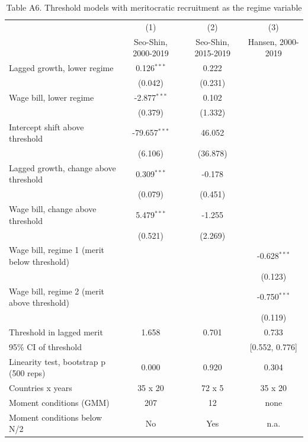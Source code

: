 \begin{table}[htbp]\centering\footnotesize
\providecommand{\sym}[1]{\ensuremath{^{#1}}}
\caption{Table A6. Threshold models with meritocratic recruitment as the regime variable}\label{tab:TableA6_threshold}
\begin{tabular}{l*{3}{c}}
\toprule
 & (1) & (2) & (3) \\
 & Seo-Shin, 2000-2019 & Seo-Shin, 2015-2019 & Hansen, 2000-2019 \\
\midrule
Lagged growth, lower regime & 0.126\sym{***} & 0.222 &  \\
 & (0.042) & (0.231) &  \\
Wage bill, lower regime & -2.877\sym{***} & 0.102 &  \\
 & (0.379) & (1.332) &  \\
Intercept shift above threshold & -79.657\sym{***} & 46.052 &  \\
 & (6.106) & (36.878) &  \\
Lagged growth, change above threshold & 0.309\sym{***} & -0.178 &  \\
 & (0.079) & (0.451) &  \\
Wage bill, change above threshold & 5.479\sym{***} & -1.255 &  \\
 & (0.521) & (2.269) &  \\
Wage bill, regime 1 (merit below threshold) &  &  & -0.628\sym{***} \\
 &  &  & (0.123) \\
Wage bill, regime 2 (merit above threshold) &  &  & -0.750\sym{***} \\
 &  &  & (0.119) \\
\midrule
Threshold in lagged merit & 1.658 & 0.701 & 0.733 \\
95\% CI of threshold &  &  & [0.552, 0.776] \\
Linearity test, bootstrap p (500 reps) & 0.000 & 0.920 & 0.304 \\
Countries x years & 35 x 20 & 72 x 5 & 35 x 20 \\
Moment conditions (GMM) & 207 & 12 & none \\
Moment conditions below N/2 & No & Yes & n.a. \\
\bottomrule
\end{tabular}

\end{table}

